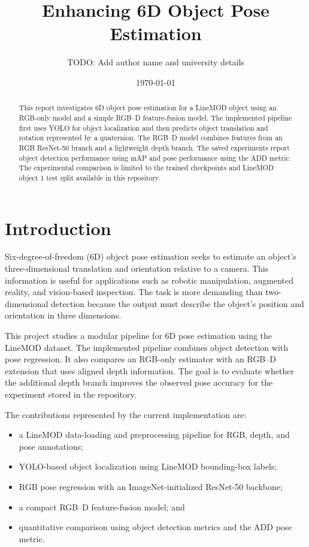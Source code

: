\documentclass[11pt,a4paper]{article}
\title{Enhancing 6D Object Pose Estimation}
\author{TODO: Add author name and university details}
\date{\today}
\begin{document}
\maketitle

\begin{abstract}
This report investigates 6D object pose estimation for a LineMOD object using
an RGB-only model and a simple RGB--D feature-fusion model. The implemented
pipeline first uses YOLO for object localization and then predicts object
translation and rotation represented by a quaternion. The RGB--D model combines
features from an RGB ResNet-50 branch and a lightweight depth branch. The saved
experiments report object detection performance using mAP and pose performance
using the ADD metric. The experimental comparison is limited to the trained
checkpoints and LineMOD object 1 test split available in this repository.
\end{abstract}

\section{Introduction}

Six-degree-of-freedom (6D) object pose estimation seeks to estimate an
object's three-dimensional translation and orientation relative to a camera.
This information is useful for applications such as robotic manipulation,
augmented reality, and vision-based inspection. The task is more demanding
than two-dimensional detection because the output must describe the object's
position and orientation in three dimensions.

This project studies a modular pipeline for 6D pose estimation using the
LineMOD dataset. The implemented pipeline combines object detection with pose
regression. It also compares an RGB-only estimator with an RGB--D extension
that uses aligned depth information. The goal is to evaluate whether the
additional depth branch improves the observed pose accuracy for the experiment
stored in the repository.

The contributions represented by the current implementation are:
\begin{itemize}
    \item a LineMOD data-loading and preprocessing pipeline for RGB, depth, and
    pose annotations;
    \item YOLO-based object localization using LineMOD bounding-box labels;
    \item RGB pose regression with an ImageNet-initialized ResNet-50 backbone;
    \item a compact RGB--D feature-fusion model; and
    \item quantitative comparison using object detection metrics and the ADD
    pose metric.
\end{itemize}
\end{document}
